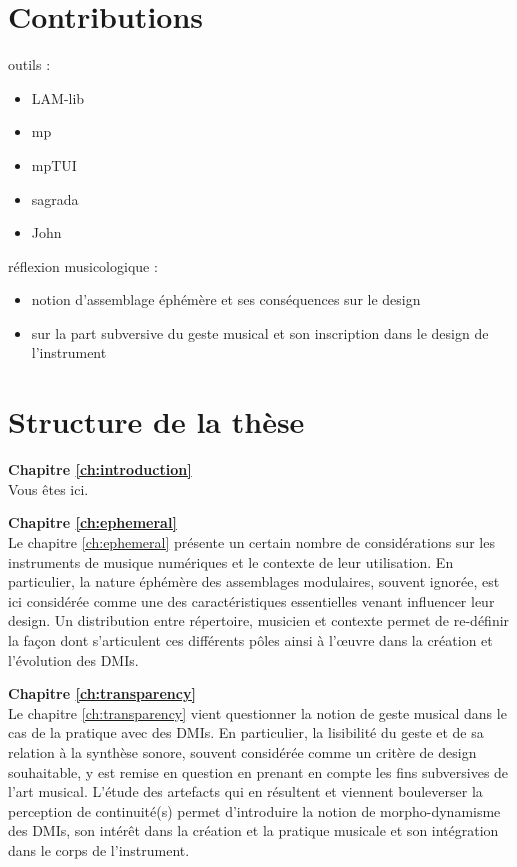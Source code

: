 \section{Contributions}

outils :
\vspace{-1em}
\begin{itemize}[noitemsep]
\item LAM-lib
\item mp
\item mpTUI
\item sagrada
\item John
\end{itemize}


réflexion musicologique : 
\vspace{-1em}
\begin{itemize}[noitemsep]
\item notion d'assemblage éphémère et ses conséquences sur le design
\item sur la part subversive du geste musical et son inscription dans le design de l'instrument
\end{itemize}



\section{Structure de la thèse}
\label{sec:preamble:structure}

\textbf{Chapitre \ref{ch:introduction}} \\[0.2em]
Vous êtes ici.

\textbf{Chapitre \ref{ch:ephemeral}} \\[0.2em]
Le chapitre \ref{ch:ephemeral} présente un certain nombre de considérations sur les instruments de musique numériques et le contexte de leur utilisation. En particulier, la nature éphémère des assemblages modulaires, souvent ignorée, est ici considérée comme une des caractéristiques essentielles venant influencer leur design. Un distribution entre répertoire, musicien et contexte permet de re-définir la façon dont s'articulent ces différents pôles ainsi à l'œuvre dans la création et l'évolution des DMIs.

\textbf{Chapitre \ref{ch:transparency}} \\[0.2em]
Le chapitre \ref{ch:transparency} vient questionner la notion de geste musical dans le cas de la pratique avec des DMIs. En particulier, la lisibilité du geste et de sa relation à la synthèse sonore, souvent considérée comme un critère de design souhaitable, y est remise en question en prenant en compte les fins subversives de l'art musical. L'étude des artefacts qui en résultent et viennent bouleverser la perception de continuité(s) permet d'introduire la notion de morpho-dynamisme des DMIs, son intérêt dans la création et la pratique musicale et son intégration dans le corps de l'instrument.

